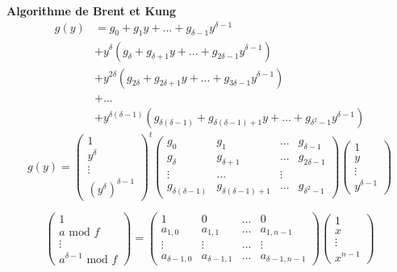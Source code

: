 \documentclass[10pt,a4paper]{beamer}
\begin{document}
\begin{frame}
    \textbf{Algorithme de Brent et Kung} 
    \begin{align*}
        g(y) &= g_0 + g_1y + ... + g_{\delta-1}y^{\delta-1} \\
            &+ y^\delta(g_\delta + g_{\delta+1}y + ... + g_{2\delta-1}y^{\delta-1}) \\
                                          &+ y^{2\delta}(g_{2\delta} + g_{2\delta+1}y + ... + g_{3\delta-1}y^{\delta-1}) \\
                                          &+ ... \\
                                          &+ y^{\delta(\delta-1)}(g_{\delta(\delta-1)} + g_{\delta(\delta-1)+1}y + ... + g_{\delta^2-1}y^{\delta-1}) 
    \end{align*}
    \[
    g(y) = 
    \begin{pmatrix}
        1 \\
        y^\delta \\
        \vdots \\
        (y^\delta)^{\delta-1} 
    \end{pmatrix}^t
    \begin{pmatrix}
        g_0 & g_1 & ... & g_{\delta-1} \\
        g_{\delta} & g_{\delta+1} & ... & g_{2\delta-1} \\
        \vdots & ... & \vdots \\
        g_{\delta(\delta-1)} & g_{\delta(\delta-1)+1} & ... & g_{\delta^2-1}
    \end{pmatrix}
    \begin{pmatrix}
        1 \\
        y \\
        \vdots \\
        y^{\delta-1}
    \end{pmatrix}
    \]
    
    \[
        \begin{pmatrix}
            1 \\
            a \text{ mod }f\\
            \vdots \\
            a^{\delta-1} \text{ mod }f
        \end{pmatrix}
        =
        \begin{pmatrix}
            1 & 0 & ... & 0 \\
            a_{1,0} & a_{1,1} & ... & a_{1,n-1} \\
            \vdots & \vdots & ... & \vdots \\
            a_{\delta-1,0} & a_{\delta-1,1} & ... & a_{\delta-1,n-1}
        \end{pmatrix}
        \begin{pmatrix}
            1 \\
            x \\
            \vdots \\
            x^{n-1}
        \end{pmatrix}
    \]
\end{frame}
\end{document}
